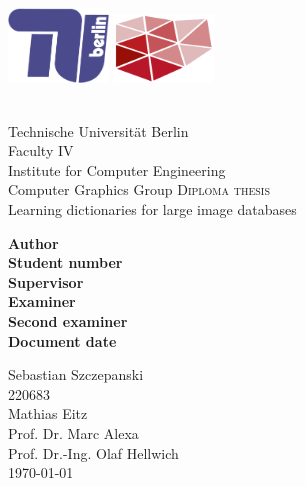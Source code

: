 
\begin{titlepage}


\includegraphics[width=0.2\textwidth]{images/logo/tu-logo_2d_blau.png}
\hfill
\includegraphics[width=0.2\textwidth]{images/logo/dgm_red.pdf}\\
\vspace{20pt}\\
\begin{center} 
Technische Universit\"{a}t Berlin\\
Faculty IV\\
Institute for Computer Engineering\\
Computer Graphics Group
\vfill
\textsc{\Large Diploma thesis}\\[0.5cm]
{\huge Learning dictionaries for large image databases}\\
[0.4cm]


\vfill
\begin{minipage}[t]{0.48\textwidth}
\flushright
\textbf{Author}\\
\textbf{Student number}\\
\textbf{Supervisor}\\
\textbf{Examiner}\\
\textbf{Second examiner}\\
\textbf{Document date}
\end{minipage}
\begin{minipage}[t]{0.48\textwidth}
\flushleft 
Sebastian Szczepanski\\
220683\\
Mathias Eitz\\
Prof. Dr. Marc Alexa\\
Prof. Dr.-Ing. Olaf Hellwich\\
\today{}
\end{minipage}
\end{center}

\end{titlepage}

\clearpage

